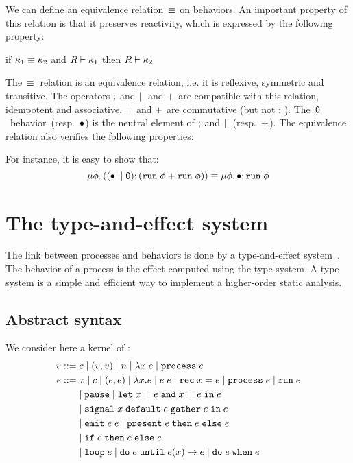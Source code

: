 \documentclass[9pt,preprint]{sigplanconf}
\newcommand{\sdeq}{::=}
\begin{document}
We can define an equivalence relation~$\equiv$ on behaviors. An important property of this relation is that it preserves reactivity, which is expressed by the following property:
\begin{property}
\label{prop:equiv_reactivty}
if $\kappa_1 \equiv \kappa_2$ and $R \vdash \kappa_1$ then $R \vdash \kappa_2$
\end{property}

The~$\equiv$~relation is an equivalence relation, i.e. it is reflexive, symmetric and transitive. The operators $;$ and $ \mid\mid $ and $+$ are compatible with this relation, idempotent and associative. $ \mid\mid $~and $+$ are commutative (but not $;\,$). The~$\textsf{0}$~behavior~(resp.~$\bullet$) is the neutral element of $;$ and $ \mid\mid $ (resp.~$+$). The equivalence relation also verifies the following properties:
%

For instance, it is easy to show that:
\[
\mu \phi.\, ((\bullet \mid\mid \textsf{0}) ; (\mathtt{run}\; \phi + \mathtt{run}\; \phi))  \equiv  \mu \phi.\, \bullet ; \mathtt{run}\; \phi
\]

\section{The type-and-effect system}
\label{sec:type_system}

The link between processes and behaviors is done by a type-and-effect system~\cite{Lucassen:1988}. The behavior of a process is the effect computed using the type system. A type system is a simple and efficient way to implement a higher-order static analysis.

\subsection{Abstract syntax}

We consider here a kernel of \rml{}:
%
\begin{align*}
v \sdeq &\; c \mid (v, v) \mid n \mid \elam{x}{e} \mid \eproc{e} \\
e \sdeq &\;  x \mid c \mid (e, e) \mid \elam{x}{e} 
  \mid \eapp{e}{e} \mid \erec{x}{e}  \mid \eproc{e} \mid \erun{e} \\
 & \mid \epause{} \mid \eletpar{x}{e}{x}{e}{e} \\
 &\mid \esig{x}{e}{e}{e} \\
 & \mid \eemit{e}{e} \mid \epres{e}{e}{e} \\
 & \mid \eite{e}{e}{e} \\
 &  \mid \eloop{e} \mid \euntil{e}{e}{x}{e} 
   \mid \ewhen{e}{e} 
\end{align*}
\end{document}
